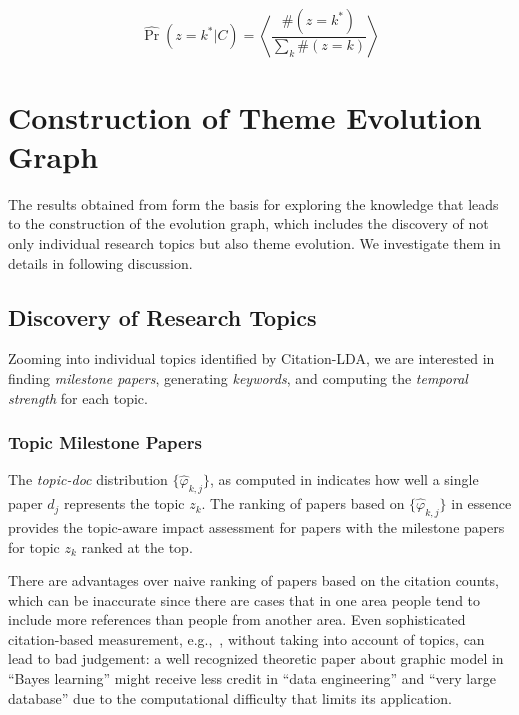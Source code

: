 \begin{equation}
  \hat\Pr(z=k^* | C) =
  \left\langle \frac{\#(z = k^*)}{\sum\limits_k \#(z=k) } \right\rangle
  \label{eq::citation_eq_topwei}
\end{equation}

\section{Construction of Theme Evolution Graph}\label{sec::citation-graph}

The results obtained from
 form the
basis for exploring the knowledge that leads to the construction of the
evolution graph, which includes the discovery of not only individual research
topics but also theme evolution.  We investigate them in details in following
discussion.

\subsection{Discovery of Research Topics}

Zooming into individual topics identified by Citation-LDA, we are interested in
finding \emph{milestone papers}, generating \emph{keywords}, and computing the
\emph{temporal strength} for each topic.

\subsubsection{Topic Milestone Papers}

The \emph{topic-doc} distribution $\{\hat\varphi_{k,j}\}$, as computed in
 indicates how well a single paper $d_j$ represents
the topic $z_k$. The ranking of papers based on $\{\hat\varphi_{k,j}\}$ in
essence provides the topic-aware impact assessment for papers with the milestone
papers for topic $z_k$ ranked at the top.

There are advantages over naive ranking of papers based on the citation counts,
which can be inaccurate since there are cases that in one area people tend to
include more references than people from another area.  Even sophisticated
citation-based measurement,
e.g.,~\cite{ghosh2011time,radev2009acl,sayyadi2009futurerank,walker2007ranking},
without taking into account of topics, can lead to bad judgement: a well
recognized theoretic paper about graphic model in ``Bayes learning'' might
receive less credit in ``data engineering'' and ``very large database'' due to
the computational difficulty that limits its application.

